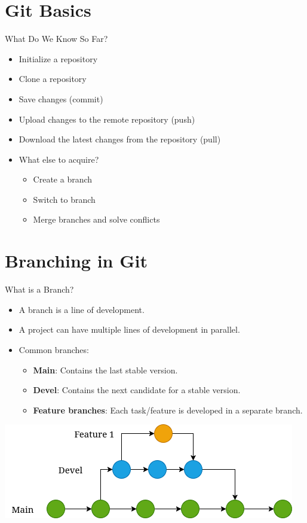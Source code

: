 \section{Git Basics}

\begin{frame}{What Do We Know So Far?}
  \begin{itemize}
    \item Initialize a repository
    \item Clone a repository
    \item Save changes (commit)
    \item Upload changes to the remote repository (push)
    \item Download the latest changes from the repository (pull)
    \item What else to acquire?
    \begin{itemize}
        \item Create a branch
        \item Switch to branch
        \item Merge branches and solve conflicts
    \end{itemize}
  \end{itemize}
\end{frame}

\section{Branching in Git}

\begin{frame}{What is a Branch?}
  \begin{itemize}
    \item A branch is a line of development.
    \item A project can have multiple lines of development in parallel.
    \item Common branches:
      \begin{itemize}
        \item \textbf{Main}: Contains the last stable version.
        \item \textbf{Devel}: Contains the next candidate for a stable version.
        \item \textbf{Feature branches}: Each task/feature is developed in a separate branch.
      \end{itemize}
  \end{itemize}
  
  \centering
  \includegraphics[width=0.5\linewidth]{trainingmaterials/git-II/rpi_upm.branches.png }
\end{frame}

